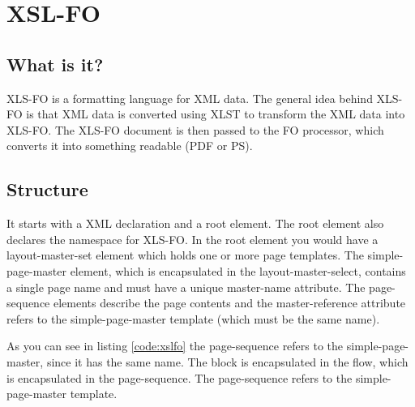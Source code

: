 \chapter{XSL-FO}
\label{chap:xsl-fo}

\section{What is it?}

XLS-FO\cite{wikixslfo,w3schoolxslfo} is a formatting language for XML data. The general idea behind XLS-FO is that XML data is converted using XLST to transform the XML data into XLS-FO. The XLS-FO document is then passed to the FO processor, which converts it into something readable (PDF or PS). 

\section{Structure}

It starts with a XML declaration and a root element. The root element also declares the namespace for XLS-FO. In the root element you would have a layout-master-set element which holds one or more page templates. The simple-page-master element, which is encapsulated in the layout-master-select, contains a single page name and must have a unique master-name attribute. The page-sequence elements describe the page contents and the master-reference attribute refers to the simple-page-master template (which must be the same name). 



As you can see in listing \ref{code:xslfo} the page-sequence refers to the simple-page-master, since it has the same name. The block is encapsulated in the flow, which is encapsulated in the page-sequence. The page-sequence refers to the simple-page-master template.